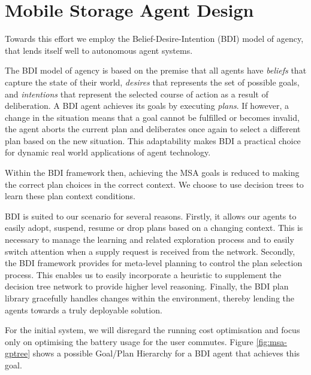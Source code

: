 \documentclass[a4paper]{article}
\begin{document}
\section{Mobile Storage Agent Design}

Towards this effort we employ the Belief-Desire-Intention (BDI) \cite{rao1995bdi-a} model of agency, that lends itself well to autonomous agent systems. 

The BDI model of agency is based on the premise that all agents have \textit{beliefs} that capture the state of their world, \textit{desires} that represents the set of possible goals, and \textit{intentions} that represent the selected course of action as a result of deliberation. A BDI agent achieves its goals by executing \textit{plans}. If however, a change in the situation means that a goal cannot be fulfilled or becomes invalid, the agent aborts the current plan and deliberates once again to select a different plan based on the new situation. This adaptability makes BDI a practical choice for dynamic real world applications of agent technology.

Within the BDI framework then, achieving the MSA goals is reduced to making the correct plan choices in the correct context. We choose to use decision trees to learn these plan context conditions.

BDI is suited to our scenario for several reasons. Firstly, it allows our agents to easily adopt, suspend, resume or drop plans based on a changing context. This is necessary to manage the learning and related exploration process and to easily switch attention when a supply request is received from the network. Secondly, the BDI framework provides for meta-level planning to control the plan selection process. This enables us to easily incorporate a heuristic to supplement the decision tree network to provide higher level reasoning. Finally, the BDI plan library gracefully handles changes within the environment, thereby lending the agents towards a truly deployable solution.

For the initial system, we will disregard the running cost optimisation and focus only on optimising the battery usage for the user commutes. Figure \ref{fig:msa-gptree}  shows a possible Goal/Plan Hierarchy for a BDI agent that achieves this goal.
\end{document}

